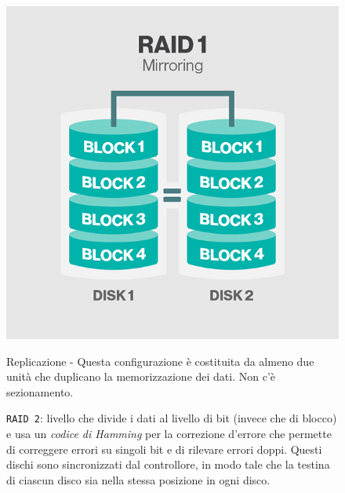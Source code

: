 \begin{itemize}
\begin{figure}[htbp]
\centering
\includegraphics[scale=0.40]{img/raid11.png}\\
\caption{Replicazione - Questa configurazione \`{e} costituita da almeno due unit\`{a} che duplicano la memorizzazione dei dati. Non c'\`{e} sezionamento.\label{figura1.4} \cite{etichetta9}}
\end{figure}

\begin{figure}[htbp]
\item
\verb"RAID 2": livello che divide i dati al livello di bit (invece che di blocco) e usa un \textit{codice di Hamming} per la correzione d'errore che permette di correggere errori su singoli bit e di rilevare errori doppi. Questi dischi sono sincronizzati dal controllore, in modo tale che la testina di ciascun disco sia nella stessa posizione in ogni disco.\cite{etichetta10}\\


\end{figure}
\end{itemize}
